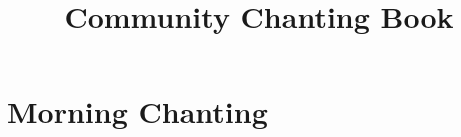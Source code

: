 \documentclass[final,showtrims]{chantingbook}
\title{Community Chanting Book}
\begin{document}
%
%

\mainmatter


\part{Morning Chanting}



%
%

%
%

%
%
\end{document}
